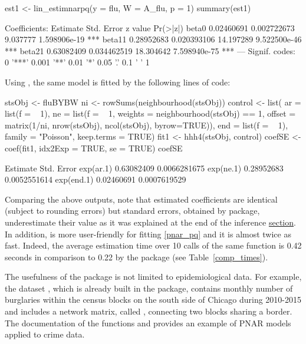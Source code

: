 \begin{example}
	est1 <- lin_estimnarpq(y = flu, W = A_flu, p = 1)
	summary(est1)
	
	Coefficients: 
	         Estimate  Std. Error   z value     Pr(>|z|)    
	beta0  0.02460691 0.002722673  9.037777 1.598906e-19 ***
	beta11 0.28952683 0.020393106 14.197289 9.522500e-46 ***
	beta21 0.63082409 0.034462519 18.304642 7.598940e-75 ***
	--- 
	Signif. codes:  0 '***' 0.001 '**' 0.01 '*' 0.05 '.' 0.1 ' ' 1 
	
\end{example}

\noindent
Using  , the same model is fitted by the following lines of code:
\begin{example}
	stsObj <- fluBYBW
	ni <- rowSums(neighbourhood(stsObj))
	control <- list( ar = list(f = ~ 1), 
	ne = list(f = ~ 1, weights = neighbourhood(stsObj) == 1, 
	offset = matrix(1/ni, nrow(stsObj), ncol(stsObj), byrow=TRUE)), 
	end = list(f = ~ 1),
	family = "Poisson", keep.terms = TRUE)
	fit1 <- hhh4(stsObj, control)
	coefSE <- coef(fit1, idx2Exp = TRUE, se = TRUE)
	coefSE
	
	             Estimate   Std. Error
	exp(ar.1)  0.63082409 0.0066281675
	exp(ne.1)  0.28952683 0.0052551614
	exp(end.1) 0.02460691 0.0007619529
	
\end{example}

\noindent
Comparing the above outputs, 
note that estimated coefficients are identical (subject to rounding errors) but  standard errors, obtained by 
 package,  underestimate their value as it was explained at the end of the inference
\hyperref[subsec:Inference]{section}.
In addition,  is more user-friendly for fitting \eqref{pnar_pq} and it is almost twice as fast. Indeed, 
the average estimation time over 10 calls of the same  function is 0.42 seconds in comparison  to 0.22  by the   package (see Table~\ref{comp_times}). 

The usefulness of the  package is not limited to epidemiological data. For example, the dataset , which is  already built in the package, contains  monthly number of burglaries within the census blocks on the south side of Chicago during 2010-2015 and includes a network matrix, called , connecting two blocks sharing a border. The documentation of the
functions  and  provides an example of  PNAR models applied to crime data. 



